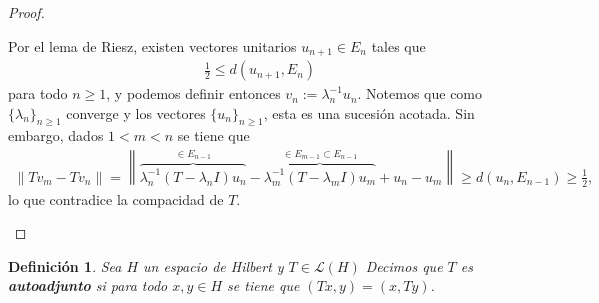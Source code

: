 \documentclass[11pt]{report}
\theoremstyle{colored}
\newtheorem{definition}{Definición}[section]
\newcommand{\ip}[1]{( #1 )}
\begin{document}
\begin{proof}
\begin{itemize}[listparindent = \parindent]
Por el lema de Riesz, existen vectores unitarios $u_{n+1} \in E_n$ tales que
\begin{align*}
\frac{1}{2} \leq d(u_{n+1},E_n)
\end{align*}
para todo $n \geq 1$, y podemos definir entonces $v_n := \lambda_n^{-1}u_n$. Notemos que como $\{\lambda_n\}_{n \geq 1}$ converge y los vectores $\{u_n\}_{n \geq 1}$, esta es una sucesión acotada. Sin embargo, dados $1 < m < n$ se tiene que
\begin{align*}
\|Tv_m-Tv_n\| = \left\|\overbrace{\lambda_n^{-1}(T-\lambda_nI)u_n}^{\in E_{n-1}} - \overbrace{\lambda_m^{-1}(T-\lambda_mI)u_m}^{\in E_{m-1} \subset E_{n-1}} + u_n - u_m \right\| \geq d(u_n,E_{n-1}) \geq \frac{1}{2},
\end{align*}
lo que contradice la compacidad de $T$.
\end{itemize}
\end{proof}

\begin{definition} Sea $H$ un espacio de Hilbert y $T \in \mathscr{L}(H)$ Decimos que $T$ es \textbf{autoadjunto} si para todo $x,y \in H$ se tiene que $\ip{Tx,y} = \ip{x,Ty}$.
\end{definition}
\end{document}
